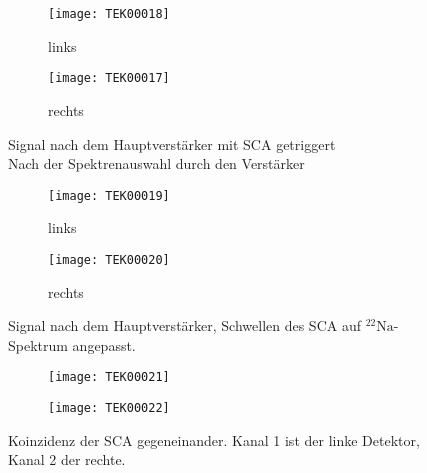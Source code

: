 \documentclass[11pt, ngerman, fleqn, DIV=15, headinclude, BCOR=2cm]{scrreprt}
\begin{document}
\fehlt%
\fehlt%

\begin{figure}
	\centering
	\begin{subfigure}{0.49 \textwidth}
		\texttt{[image: TEK00018]}
		\caption{%
			links
		}
		\label{fig:slow_signal_hv_eingestellt-li}
	\end{subfigure}
	\begin{subfigure}{0.49 \textwidth}
		\texttt{[image: TEK00017]}
		\caption{%
			rechts
		}
		\label{fig:slow_signal_hv_eingestellt-re}
	\end{subfigure}
	\caption{%
		Signal nach dem Hauptverstärker mit SCA getriggert\\
		Nach der Spektrenauswahl durch den Verstärker
	}
	\label{fig:slow_signal_hv_eingestellt}
\end{figure}

\begin{figure}
	\centering
	\begin{subfigure}{0.49 \textwidth}
		\texttt{[image: TEK00019]}
		\caption{%
			links
		}
		\label{fig:slow_signal_sca_eingestellt-li}
	\end{subfigure}
	\begin{subfigure}{0.49 \textwidth}
		\texttt{[image: TEK00020]}
		\caption{%
			rechts
		}
		\label{fig:slow_signal_sca_eingestellt-re}
	\end{subfigure}
	\caption{%
		Signal nach dem Hauptverstärker, Schwellen des SCA auf
		$^{22}\text{Na}$-Spektrum angepasst.
	}
	\label{fig:slow_signal_sca_eingestellt}
\end{figure}

\fehlt%

\begin{figure}
	\centering
	\begin{subfigure}{0.49 \textwidth}
		\texttt{[image: TEK00021]}
	\end{subfigure}
	\begin{subfigure}{0.49 \textwidth}
		\texttt{[image: TEK00022]}
	\end{subfigure}
	\caption{%
		Koinzidenz der SCA gegeneinander. Kanal 1 ist der linke
		Detektor, Kanal 2 der rechte.
	}
	\label{fig:slow_signal_sca_koinzidenz}
\end{figure}


\end{document}
